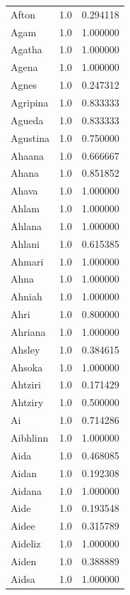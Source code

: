 \documentclass[
  letterpaper,
  DIV=11,
  numbers=noendperiod]{scrreprt}
\begin{document}
\begin{tabular}{lrr}
Afton           &   1.0 &   0.294118 \\
Agam            &   1.0 &   1.000000 \\
Agatha          &   1.0 &   1.000000 \\
Agena           &   1.0 &   1.000000 \\
Agnes           &   1.0 &   0.247312 \\
Agripina        &   1.0 &   0.833333 \\
Agueda          &   1.0 &   0.833333 \\
Agustina        &   1.0 &   0.750000 \\
Ahaana          &   1.0 &   0.666667 \\
Ahana           &   1.0 &   0.851852 \\
Ahava           &   1.0 &   1.000000 \\
Ahlam           &   1.0 &   1.000000 \\
Ahlana          &   1.0 &   1.000000 \\
Ahlani          &   1.0 &   0.615385 \\
Ahmari          &   1.0 &   1.000000 \\
Ahna            &   1.0 &   1.000000 \\
Ahniah          &   1.0 &   1.000000 \\
Ahri            &   1.0 &   0.800000 \\
Ahriana         &   1.0 &   1.000000 \\
Ahsley          &   1.0 &   0.384615 \\
Ahsoka          &   1.0 &   1.000000 \\
Ahtziri         &   1.0 &   0.171429 \\
Ahtziry         &   1.0 &   0.500000 \\
Ai              &   1.0 &   0.714286 \\
Aibhlinn        &   1.0 &   1.000000 \\
Aida            &   1.0 &   0.468085 \\
Aidan           &   1.0 &   0.192308 \\
Aidana          &   1.0 &   1.000000 \\
Aide            &   1.0 &   0.193548 \\
Aidee           &   1.0 &   0.315789 \\
Aideliz         &   1.0 &   1.000000 \\
Aiden           &   1.0 &   0.388889 \\
Aidsa           &   1.0 &   1.000000 \\

\end{tabular}
\end{document}
